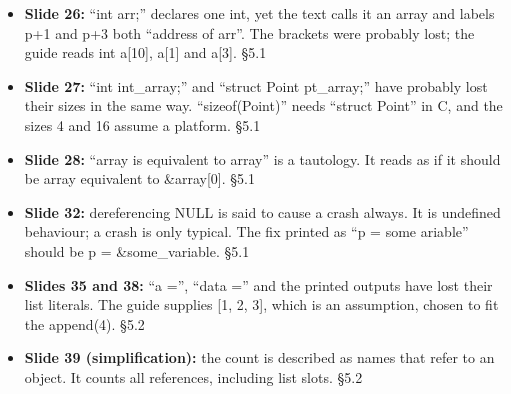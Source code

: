 \documentclass[11pt]{article}
\begin{document}
\begin{keepsection}
\begin{itemize}
\item \textbf{Slide 26:} “int arr;” declares one int, yet the text calls it an array and labels p+1 and p+3 both “address of arr”. The brackets were probably lost; the guide reads int a[10], a[1] and a[3]. \hfill{\small\color{FAUblue}§5.1}
\item \textbf{Slide 27:} “int int\_array;” and “struct Point pt\_array;” have probably lost their sizes in the same way. “sizeof(Point)” needs “struct Point” in C, and the sizes 4 and 16 assume a platform. \hfill{\small\color{FAUblue}§5.1}
\item \textbf{Slide 28:} “array is equivalent to array” is a tautology. It reads as if it should be array equivalent to \&array[0]. \hfill{\small\color{FAUblue}§5.1}
\item \textbf{Slide 32:} dereferencing NULL is said to cause a crash always. It is undefined behaviour; a crash is only typical. The fix printed as “p = some ariable” should be p = \&some\_variable. \hfill{\small\color{FAUblue}§5.1}
\item \textbf{Slides 35 and 38:} “a =”, “data =” and the printed outputs have lost their list literals. The guide supplies [1, 2, 3], which is an assumption, chosen to fit the append(4). \hfill{\small\color{FAUblue}§5.2}
\item \textbf{Slide 39 (simplification):} the count is described as names that refer to an object. It counts all references, including list slots. \hfill{\small\color{FAUblue}§5.2}
\end{itemize}
\end{keepsection}
\end{document}
